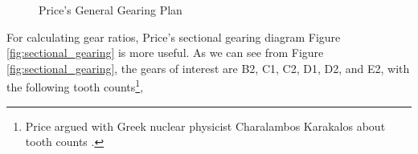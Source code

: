 \documentclass[11pt, oneside]{article}   	%
\theoremstyle{definition}
\begin{document}
\bigskip
\begin{figure}[H]
\caption{Price's General Gearing Plan \cite{gears_from_the_greeks}}
\label{fig:general_gearing_plan}
\end{figure}

\bigskip
\noindent
For calculating gear ratios,  Price's sectional gearing diagram Figure \ref{fig:sectional_gearing} is more useful. As we can see from Figure \ref{fig:sectional_gearing}, the gears of interest
are B2, C1, C2, D1, D2, and E2, with the following tooth counts\footnote{Price argued with Greek nuclear physicist Charalambos Karakalos about tooth counts 
\cite{gears_from_the_greeks,youtube:freeth2021}.},
\end{document}
